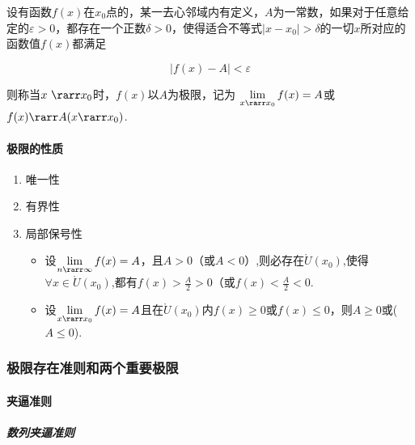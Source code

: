 \documentclass[
]{article}
\begin{document}
设有函数\(f(x)\)在\(x_0\)点的，某一去心邻域内有定义，\(A\)为一常数，如果对于任意给定的\(\varepsilon > 0\)，都存在一个正数\(\delta>0\)，使得适合不等式\({\vert x-x_0\vert} > \delta\)的一切\(x\)所对应的函数值\(f(x)\)都满足

\[{\vert f(x) - A\vert} < \varepsilon\]

则称当\(x \ \rarr x_0\)时，\(f(x)\)以\(A\)为极限，记为
\(\lim\limits_{x \rarr x_0} f(x) =A\)或\(f(x) \rarr A(x \rarr x_0)\).

\hypertarget{ux6781ux9650ux7684ux6027ux8d28-2}{%
\paragraph{极限的性质}\label{ux6781ux9650ux7684ux6027ux8d28-2}}

\begin{enumerate}
\def\labelenumi{\arabic{enumi}.}
\item
  唯一性
\item
  有界性
\item
  局部保号性

  \begin{itemize}
  \item
    设\(\lim\limits_{n \rarr \infty}f(x) = A\)，且\(A>0\)（或\(A<0\)）,则必存在\(\mathring{U}(x_0)\),使得\(\forall x \in \mathring{U}(x_0)\),都有\(f(x)>\frac{A}{2}>0\)（或\(f(x)<\frac{A}{2}<0\).
  \item
    设\(\lim\limits_{x \rarr x_0} f(x) =A\)且在\(\mathring{U}(x_0)\)内\(f(x) \ge 0 \)或\(f(x) \le 0\)，则\(A \ge 0\)或(\(A \le 0 \)).
  \end{itemize}
\end{enumerate}

\hypertarget{ux6781ux9650ux5b58ux5728ux51c6ux5219ux548cux4e24ux4e2aux91cdux8981ux6781ux9650}{%
\subsubsection{极限存在准则和两个重要极限}\label{ux6781ux9650ux5b58ux5728ux51c6ux5219ux548cux4e24ux4e2aux91cdux8981ux6781ux9650}}

\hypertarget{ux5939ux903cux51c6ux5219}{%
\paragraph{夹逼准则}\label{ux5939ux903cux51c6ux5219}}

\hypertarget{ux6570ux5217ux5939ux903cux51c6ux5219}{%
\subparagraph{数列夹逼准则}\label{ux6570ux5217ux5939ux903cux51c6ux5219}}
\end{document}
